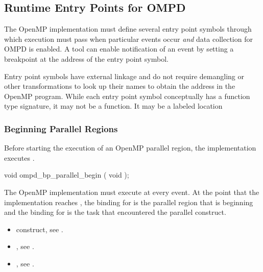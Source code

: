 \subsection{Runtime Entry Points for OMPD}
\label{subsec:runtime-entry-points-for-ompd}

The OpenMP implementation must define several entry point symbols 
through which execution must pass when particular events occur
\emph{and} data collection for OMPD is enabled. A tool can enable
notification of an event by setting a breakpoint at the address of 
the entry point symbol.

Entry point symbols have external  linkage and do not
require demangling or other transformations to look up their 
names to obtain the address in the OpenMP program. While each 
entry point symbol conceptually has a function type signature, 
it may not be a function. It may be a labeled location



\subsubsection{Beginning Parallel Regions}
\label{subsubsec:ompd_bp_parallel_begin}

\summary
Before starting the execution of an OpenMP parallel region, the 
implementation executes .

\format
\begin{cspecific}
\begin{ompSyntax}
void ompd_bp_parallel_begin ( void );
\end{ompSyntax}
\end{cspecific}

\descr
The OpenMP implementation must execute  
at every  event. At the point that the implementation 
reaches , the binding for 
 is the parallel region that is 
beginning and the binding for 
is the task that encountered the parallel construct.

\crossreferences
\begin{itemize}
\item {} construct, see .

\item {}, 
see .

\item {}, 
see .
\end{itemize}



